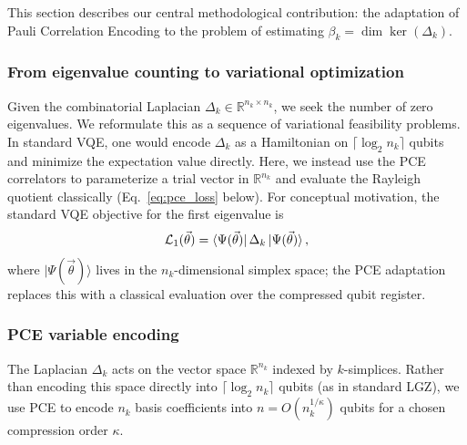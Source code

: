 \documentclass[conference,10pt]{IEEEtran}
\begin{document}
This section describes our central methodological contribution: the
adaptation of Pauli Correlation Encoding to the problem of estimating
$\beta_k = \dim\ker(\Delta_k)$.

\subsubsection{From eigenvalue counting to variational optimization}

Given the combinatorial Laplacian
$\Delta_k \in \mathbb{R}^{n_k \times n_k}$, we seek the number of
zero eigenvalues. We reformulate this as a sequence of variational
feasibility problems. In standard VQE, one would encode $\Delta_k$ as
a Hamiltonian on $\lceil \log_2 n_k\rceil$ qubits and minimize the
expectation value directly. Here, we instead use the PCE correlators
to parameterize a trial vector in $\mathbb{R}^{n_k}$ and evaluate the
Rayleigh quotient classically (Eq.~\eqref{eq:pce_loss} below). For
conceptual motivation, the standard VQE objective for the first
eigenvalue is
\begin{equation}
    \mathcal{L}_1(\vec{\theta})
    = \bra{\Psi(\vec{\theta})} \Delta_k \ket{\Psi(\vec{\theta})},
    \label{eq:loss_1}
\end{equation}
where $|\Psi(\vec{\theta})\rangle$ lives in the $n_k$-dimensional
simplex space; the PCE adaptation replaces this with a classical
evaluation over the compressed qubit register.

\subsubsection{PCE variable encoding}

The Laplacian $\Delta_k$ acts on the vector space $\mathbb{R}^{n_k}$
indexed by $k$-simplices. Rather than encoding this space directly
into $\lceil \log_2 n_k \rceil$ qubits (as in standard LGZ), we use
PCE to encode $n_k$ basis coefficients into $n = O(n_k^{1/\kappa})$
qubits for a chosen compression order $\kappa$.
\end{document}
